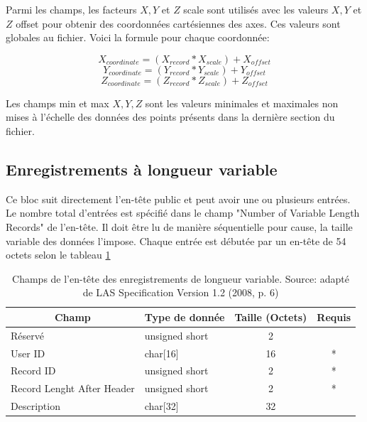 Parmi les champs, les facteurs $ X, Y $ et $ Z $ scale sont utilisés avec les valeurs $ X, Y$ et $Z$ offset pour obtenir des coordonnées cartésiennes des axes.
Ces valeurs sont globales au fichier. Voici la formule pour chaque coordonnée:

\begin{equation*}
    X_{coordinate} = (X_{record} * X_{scale}) + X_{offset}
\end{equation*}
\begin{equation*}
    Y_{coordinate}= (Y_{record} * Y_{scale}) + Y_{offset}
\end{equation*}
\begin{equation*}
    Z_{coordinate}= (Z_{record} * Z_{scale}) + Z_{offset}
\end{equation*}

Les champs min et max $X, Y, Z$ sont les valeurs minimales et maximales non mises à l'échelle des données des points présents dans la dernière section du fichier.

\subsection{Enregistrements à longueur variable}

Ce bloc suit directement l'en-tête public et peut avoir une ou plusieurs entrées.
Le nombre total d'entrées est spécifié dans le champ "Number of Variable Length Records" de l'en-tête.
Il doit être lu de manière séquentielle pour cause, la taille variable des données l'impose.
Chaque entrée est débutée par un en-tête de 54 octets selon le tableau \ref{tab:las_var_record_header}

\begin{table}[htbp!]
\centering
\begin{tabular}{|l|l|c|c|}
\hline
\multicolumn{1}{|c|}{\textbf{Champ}} & \multicolumn{1}{c|}{\textbf{Type de donnée}} & \textbf{Taille (Octets)} & \textbf{Requis} \\ \hline
Réservé                              & unsigned short                               & 2                        &                 \\ \hline
User ID                              & char{[}16{]}                                 & 16                       & *               \\ \hline
Record ID                            & unsigned short                               & 2                        & *               \\ \hline
Record Lenght After Header           & unsigned short                               & 2                        & *               \\ \hline
Description                          & char{[}32{]}                                 & 32                       &                 \\ \hline
\end{tabular}
\caption{
Champs de l'en-tête des enregistrements de longueur variable.
Source: adapté de LAS Specification Version 1.2 (2008, p. 6)}
\label{tab:las_var_record_header}
\end{table}

